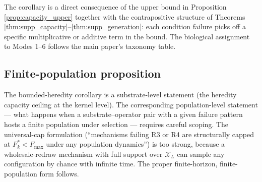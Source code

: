 \documentclass[11pt]{article}
\theoremstyle{plain}
\theoremstyle{definition}
\newcommand{\Xset}{\mathcal{X}}
\begin{document}
The corollary is a direct consequence of the upper bound in Proposition \ref{prop:capacity_upper} together with the contrapositive structure of Theorems \ref{thm:supp_capacity}--\ref{thm:supp_generation}: each condition failure picks off a specific multiplicative or additive term in the bound. The biological assignment to Modes 1--6 follows the main paper's taxonomy table.

\subsection{Finite-population proposition}
\label{subsec:plateau}

The bounded-heredity corollary is a substrate-level statement (the heredity capacity ceiling at the kernel level). The corresponding population-level statement --- what happens when a substrate--operator pair with a given failure pattern hosts a finite population under selection --- requires careful scoping. The universal-cap formulation (``mechanisms failing R3 or R4 are structurally capped at $F^*_k < F_{\max}$ under any population dynamics'') is too strong, because a wholesale-redraw mechanism with full support over $\Xset_L$ can sample any configuration by chance with infinite time. The proper finite-horizon, finite-population form follows.
\end{document}

